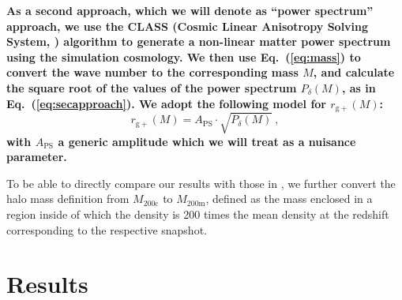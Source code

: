\documentclass[a4paper,fleqn,usenatbib]{mnras}
\newenvironment{correction}
 {\bfseries}%
  {}%
\begin{document}
\begin{correction}
As a second approach, which we will denote as ``power spectrum'' approach, we use the CLASS (Cosmic Linear Anisotropy Solving System, \citealt{Blasetal2011}) algorithm to generate a non-linear matter power spectrum using the simulation cosmology. We then use Eq.~(\ref{eq:mass}) to convert the wave number to the corresponding mass $M$, and calculate the square root of the values of the power spectrum $P_\delta(M)$, as in Eq.~(\ref{eq:secapproach}). We adopt the following model for $r_{\mathrm{g+}} (M)$:
\begin{equation}
 r_{\mathrm{g+}} (M) = A_\mathrm{PS} \cdot  \sqrt{P_\delta(M)} \ ,
 \label{eq:secapproachmodel}
\end{equation}
with $A_\mathrm{PS}$ a generic amplitude which we will treat as a nuisance parameter.

\end{correction}

To be able to directly compare our results with those in \citet[figure 7]{vanUitertJoachimi2017}, we further convert the halo mass definition from $M_{\mathrm{200c}}$ to $M_{\mathrm{200m}}$, defined as the mass enclosed in a region inside of which the density is 200 times the mean density at the redshift corresponding to the respective snapshot.

\section{Results}
\label{sec:resanddiscuss}
\end{document}
